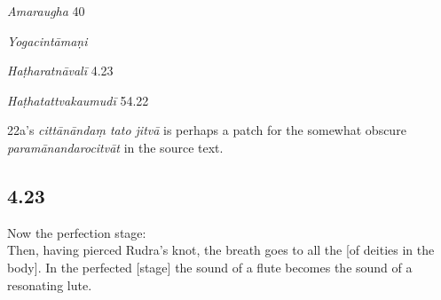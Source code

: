 \begin{ekdosis}
\begin{sources}[hp04_022]
\emph{Amaraugha} 40
\begin{versinnote}
\tl{\var{40a paramānanda° ] $\beta$; cittānandaṃ $\theta$ • °rocitvāt ] $\beta$; tato jitvā $\theta$}\\!}
\end{versinnote}
\end{sources}

\begin{testimonia}[hp04_022]
\emph{Yogacintāmaṇi}
\begin{versinnote}
\end{versinnote}

\emph{Haṭharatnāvalī} 4.23
\begin{versinnote}
\end{versinnote}

\emph{Haṭhatattvakaumudī} 54.22
\begin{versinnote}
\end{versinnote}
\end{testimonia}

\begin{philcomm}[hp04_022]
22a’s \emph{cittānāndaṃ tato jitvā} is perhaps a patch for the somewhat obscure \emph{paramānandarocitvāt} in the source text.
\end{philcomm}

\subsection*{4.23}
\begin{translation}[hp04_023]
Now the perfection stage:\\
Then, having pierced Rudra's knot, the breath goes to all the  [of deities in the body]. In the perfected [stage] the sound of a flute becomes the sound of a resonating lute.
\end{translation}



\end{ekdosis}

